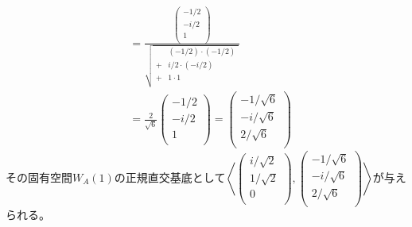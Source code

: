 \documentclass[dvipdfmx]{jsarticle}
\begin{document}
\begin{align*}
&= \frac{\begin{pmatrix}
 - {1}/{2} \\
 - {i}/{2} \\
1 \\
\end{pmatrix}}{\sqrt{\begin{matrix}
\  & \left( - {1}/{2} \right) \cdot \left( - {1}/{2} \right) \\
 + &  {i}/{2} \cdot \left( - {i}/{2} \right) \\
 + & 1 \cdot 1 \\
\end{matrix}}}\\
&= \frac{2}{\sqrt{6}}\begin{pmatrix}
 - {1}/{2} \\
 - {i}/{2} \\
1 \\
\end{pmatrix} = \begin{pmatrix}
 - {1}/{\sqrt{6}} \\
 - {i}/{\sqrt{6}} \\
{2}/{\sqrt{6}} \\
\end{pmatrix}
\end{align*}
その固有空間$W_{A}(1)$の正規直交基底として$\left\langle \begin{pmatrix}
{i}/{\sqrt{2}} \\
{1}/{\sqrt{2}} \\
0 \\
\end{pmatrix},\begin{pmatrix}
 - {1}/{\sqrt{6}} \\
 - {i}/{\sqrt{6}} \\
{2}/{\sqrt{6}} \\
\end{pmatrix} \right\rangle$が与えられる。\par
\end{document}
